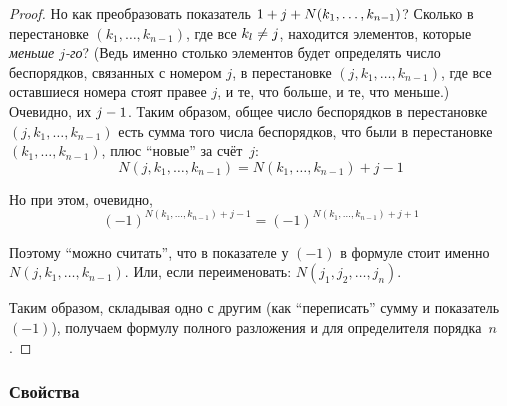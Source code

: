 \documentclass[a4paper,12pt]{article}
\theoremstyle{remark}
\begin{document}
\begin{proof}
    Но как преобразовать показатель $1 \hm+ j \hm+ N(k_1, \ldots, k_{n-1})$?
    Сколько в перестановке $(k_1, \ldots, k_{n-1})$, где все $k_l \hm{\not=} j$, находится элементов, которые \emph{меньше $j$-го}?
    (Ведь именно столько элементов будет определять число беспорядков, связанных с номером $j$, в перестановке $(j, k_1, \ldots, k_{n-1})$, где все оставшиеся номера стоят правее $j$, и те, что больше, и те, что меньше.)
    Очевидно, их $j \hm- 1$.
    Таким образом, общее число беспорядков в перестановке $(j, k_1, \ldots, k_{n-1})$ есть сумма того числа беспорядков, что были в перестановке~$(k_1, \ldots, k_{n-1})$, плюс ``новые'' за счёт~$j$:  %
    \[
      N(j, k_1, \ldots, k_{n-1}) = N(k_1, \ldots, k_{n-1}) + j - 1
    \]
    
    Но при этом, очевидно,
    \[
      (-1)^{N(k_1, \ldots, k_{n-1}) + j - 1} = (-1)^{N(k_1, \ldots, k_{n-1}) + j + 1}
    \]
    
    Поэтому ``можно считать'', что в показателе у $(-1)$ в формуле стоит именно~$N(j, k_1, \ldots, k_{n-1})$.
    Или, если переименовать: $N(j_1, j_2, \ldots, j_n)$.
    
    Таким образом, складывая одно с другим (как ``переписать'' сумму и показатель $(-1)$), получаем формулу полного разложения и для определителя порядка~$n$.
  \end{proof}
  
  
  \subsubsection{Свойства}
  
\end{document}
